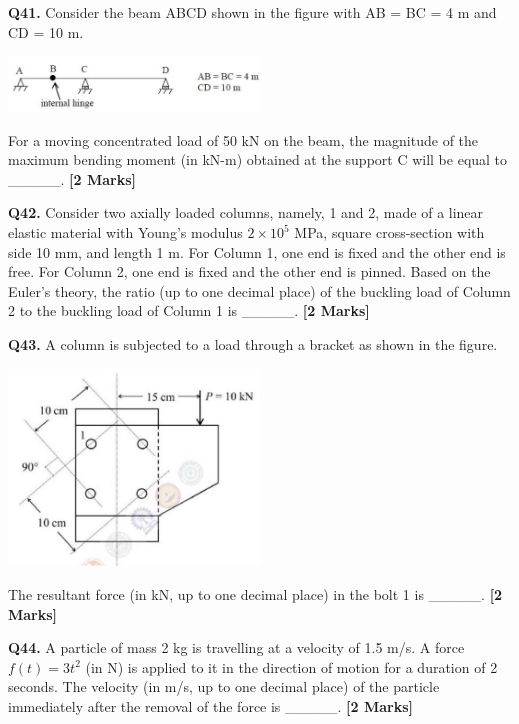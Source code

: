 \documentclass[11pt]{article}
\newcommand{\questionb}[2]{
    \noindent\textbf{Q#2.} #1 \hfill \textbf{[2 Marks]}
}
\begin{document}
\vspace{0.5cm}

\questionb{Consider the beam ABCD shown in the figure with AB = BC = 4 m and CD = 10 m. 
\begin{center}
\includegraphics[width=0.5\textwidth]{figures/41.png}
\end{center}
For a moving concentrated load of 50 kN on the beam, the magnitude of the maximum bending moment (in kN-m) obtained at the support C will be equal to \_\_\_\_\_.}{41}

\vspace{0.5cm}

\questionb{Consider two axially loaded columns, namely, 1 and 2, made of a linear elastic material with Young's modulus $2 \times 10^5$ MPa, square cross-section with side 10 mm, and length 1 m. For Column 1, one end is fixed and the other end is free. For Column 2, one end is fixed and the other end is pinned. Based on the Euler's theory, the ratio (up to one decimal place) of the buckling load of Column 2 to the buckling load of Column 1 is \_\_\_\_\_.}{42}

\vspace{0.5cm}

\questionb{A column is subjected to a load through a bracket as shown in the figure.
\begin{center}
\includegraphics[width=0.5\textwidth]{figures/43.png}
\end{center}
The resultant force (in kN, up to one decimal place) in the bolt 1 is \_\_\_\_\_.}{43}

\vspace{0.5cm}

\questionb{A particle of mass 2 kg is travelling at a velocity of 1.5 m/s. A force $f(t) = 3t^2$ (in N) is applied to it in the direction of motion for a duration of 2 seconds. The velocity (in m/s, up to one decimal place) of the particle immediately after the removal of the force is \_\_\_\_\_.}{44}
\end{document}
